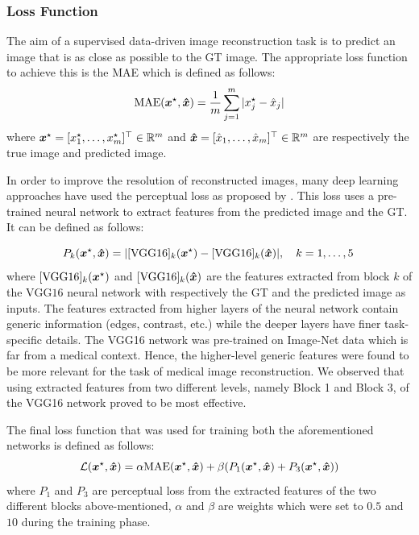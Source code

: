 \subsubsection{Loss Function}
The aim of a supervised data-driven image reconstruction task is to predict an image that is as close as possible to the \ac{GT} image. The appropriate loss function to achieve this is the \ac{MAE} which is defined as follows:
\begin{equation}
\mathrm{MAE}(\bm{x}^\star, \bm{\hat{x}}) = \frac{1}{m}   \sum_{j=1}^m |x^\star_j - \hat{x}_j|
\end{equation}
where $\bm{x}^\star =  [x_1^\star, \dots , x_m^\star]^\top \in \mathbb{R}^m$ and $\bm{\hat{x}}= [\hat{x}_1, \dots , \hat{x}_m]^\top \in \mathbb{R}^m$ are respectively the true image and predicted image.

In order to improve the resolution of reconstructed images, many deep learning approaches have used the perceptual loss as proposed by \cite{johnson2016perceptual}. This loss uses a pre-trained neural network to extract features from the predicted image and the \ac{GT}. It can be defined as follows:

\begin{equation}
P_k(\bm{x}^\star,\bm{\hat{x}}) =  |[\mathrm{VGG16}]_k(\bm{x}^\star) - [\mathrm{VGG16}]_k( \bm{\hat{x}})|, \quad k =1,\dots,5 \,  
\end{equation}
where $[\mathrm{VGG16}]_k(\bm{x}^\star)$ and $[\mathrm{VGG16}]_k( \bm{\hat{x}})$ are the features extracted from block $k$ of the $\mathrm{VGG16}$ neural network \cite{simonyan2014very} with respectively the \ac{GT} and the predicted image as inputs. The features extracted from higher layers of the neural network contain generic information (edges, contrast, etc.) while the deeper layers have finer task-specific details. The VGG16 network was pre-trained on Image-Net data \cite{deng2009imagenet} which is far from a medical context. Hence, the higher-level generic features were found to be more relevant for the task of medical image reconstruction. We observed that using extracted features from two different levels, namely Block 1 and Block 3, of the VGG16 network proved to be most effective. 

The final loss function that was used for training both the aforementioned networks is defined as follows: 
\begin{equation}\label{eq:loss}
\mathcal{L}(\bm{x}^\star,\bm{\hat{x}}) = \alpha\mathrm{MAE}(\bm{x}^\star, \bm{\hat{x}})+\beta(P_{1}(\bm{x}^\star,\bm{\hat{x}})+P_{3}(\bm{x}^\star,\bm{\hat{x}}))
\end{equation}
where $P_{1}$ and $P_{3}$ are perceptual loss from the extracted features of the two different blocks above-mentioned, $\alpha$ and $\beta$ are weights which were set to $0.5$ and $10$ during the training phase.  


